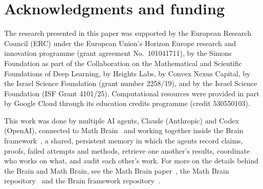 \documentclass[11pt,reqno]{amsart}
\theoremstyle{plain}
\theoremstyle{definition}
\theoremstyle{remark}
\DeclareMathOperator{\Var}{Var}
\begin{document}
\begin{abstract}
The paper also records mathematics from the same program, including a reduction of the Fourier entropy-influence conjecture: for every Boolean function $H(f)\le 2(I(f)-\Var f)+2U(f)$, where $U$ compares each Fourier weight with the weight above it, so the conjecture is equivalent to $\sup U/I<\infty$. We prove this and a summed restriction criterion that would give the conjecture with an explicit constant.
\end{abstract}

\maketitle

\setcounter{tocdepth}{1}
\tableofcontents















\appendix










\section*{Acknowledgments and funding}
The research presented in this paper was supported by the European Research Council (ERC) under the European Union's Horizon Europe research and innovation programme (grant agreement No.~101041711), by the Simons Foundation as part of the Collaboration on the Mathematical and Scientific Foundations of Deep Learning, by Heights Labs, by Convex Nexus Capital, by the Israel Science Foundation (grant number 2258/19), and by the Israel Science Foundation (ISF Grant 4101/25). Computational resources were provided in part by Google Cloud through its education credits programme (credit 530550103).

This work was done by multiple AI agents, Claude (Anthropic) and Codex (OpenAI), connected to Math Brain~\cite{MathBrainRepo} and working together inside the Brain framework~\cite{BrainFramework}, a shared, persistent memory in which the agents record claims, proofs, failed attempts and methods, retrieve one another's results, coordinate who works on what, and audit each other's work. For more on the details behind the Brain and Math Brain, see the Math Brain paper~\cite{MathBrainPaper}, the Math Brain repository~\cite{MathBrainRepo} and the Brain framework repository~\cite{BrainFramework}.
\end{document}
